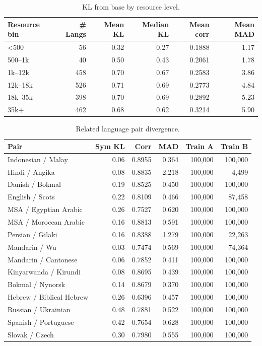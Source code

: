 \begin{table}[htbp]
\centering
\small
\begin{tabular}{lrrrrr}
\toprule
\textbf{Resource bin} & \textbf{# Langs} & \textbf{Mean KL} & \textbf{Median KL} & \textbf{Mean corr} & \textbf{Mean MAD} \\
\midrule
<500 & 56 & 0.32 & 0.27 & 0.1888 & 1.17 \\
500--1k & 40 & 0.50 & 0.43 & 0.2061 & 1.78 \\
1k--12k & 458 & 0.70 & 0.67 & 0.2583 & 3.86 \\
12k--18k & 526 & 0.71 & 0.69 & 0.2773 & 4.84 \\
18k--35k & 398 & 0.70 & 0.69 & 0.2892 & 5.23 \\
35k+ & 462 & 0.68 & 0.62 & 0.3214 & 5.90 \\
\bottomrule
\end{tabular}
\caption{KL from base by resource level.}
\label{tab:kl-resource}
\end{table}

\begin{table}[htbp]
\centering
\small
\begin{tabular}{lrrrrr}
\toprule
\textbf{Pair} & \textbf{Sym KL} & \textbf{Corr} & \textbf{MAD} & \textbf{Train A} & \textbf{Train B} \\
\midrule
Indonesian / Malay & 0.06 & 0.8955 & 0.364 & 100,000 & 100,000 \\
Hindi / Angika & 0.08 & 0.8835 & 2.218 & 100,000 & 4,499 \\
Danish / Bokmal & 0.19 & 0.8525 & 0.450 & 100,000 & 100,000 \\
English / Scots & 0.22 & 0.8109 & 0.466 & 100,000 & 87,458 \\
MSA / Egyptian Arabic & 0.26 & 0.7527 & 0.620 & 100,000 & 100,000 \\
MSA / Moroccan Arabic & 0.16 & 0.8813 & 0.591 & 100,000 & 100,000 \\
Persian / Gilaki & 0.16 & 0.8388 & 1.279 & 100,000 & 22,263 \\
Mandarin / Wu & 0.03 & 0.7474 & 0.569 & 100,000 & 74,364 \\
Mandarin / Cantonese & 0.06 & 0.7852 & 0.411 & 100,000 & 100,000 \\
Kinyarwanda / Kirundi & 0.08 & 0.8695 & 0.439 & 100,000 & 100,000 \\
Bokmal / Nynorsk & 0.14 & 0.8679 & 0.370 & 100,000 & 100,000 \\
Hebrew / Biblical Hebrew & 0.26 & 0.6396 & 0.457 & 100,000 & 100,000 \\
Russian / Ukrainian & 0.48 & 0.7881 & 0.522 & 100,000 & 100,000 \\
Spanish / Portuguese & 0.42 & 0.7654 & 0.628 & 100,000 & 100,000 \\
Slovak / Czech & 0.30 & 0.7980 & 0.555 & 100,000 & 100,000 \\
\bottomrule
\end{tabular}
\caption{Related language pair divergence.}
\label{tab:pairwise-kl}
\end{table}